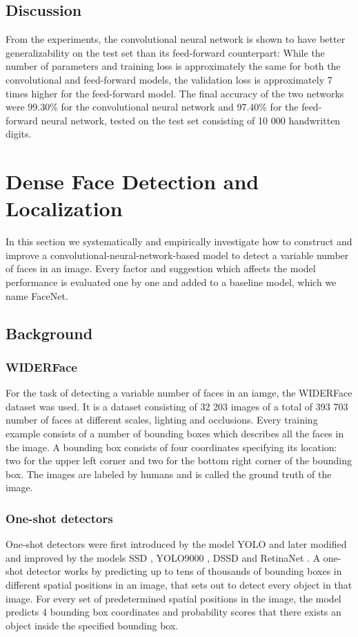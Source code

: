 \documentclass[a4paper, twoside]{article}
\begin{document}
\subsection{Discussion}
From the experiments, the convolutional neural network is shown to have better generalizability on the test set than its feed-forward counterpart: While the number of parameters and training loss is approximately the same for both the convolutional and feed-forward models, the validation loss is approximately 7 times higher for the feed-forward model. The final accuracy of the two networks were 99.30\% for the convolutional neural network and 97.40\% for the feed-forward neural network, tested on the test set consisting of 10 000 handwritten digits. 

\section{Dense Face Detection and Localization}
In this section we systematically and empirically investigate how to construct and improve a convolutional-neural-network-based model to detect a variable number of faces in an image. Every factor and suggestion which affects the model performance is evaluated one by one and added to a baseline model, which we name FaceNet.

\subsection{Background}
\subsubsection{WIDERFace}
For the task of detecting a variable number of faces in an iamge, the WIDERFace dataset \cite{WIDERFace} was used. It is a dataset consisting of 32 203 images of a total of 393 703 number of faces at different scales, lighting and occlusions. Every training example consists of a number of bounding boxes which describes all the faces in the image. A bounding box consists of four coordinates specifying its location: two for the upper left corner and two for the bottom right corner of the bounding box. The images are labeled by humans and is called the ground truth of the image.

\subsubsection{One-shot detectors}
One-shot detectors were first introduced by the model YOLO \cite{yolo} and later modified and improved by the models SSD \cite{ssd}, YOLO9000 \cite{yolo9000}, DSSD \cite{dssd} and RetinaNet \cite{retinanet}. A one-shot detector works by predicting up to tens of thousands of bounding boxes in different spatial positions in an image, that sets out to detect every object in that image. For every set of predetermined spatial positions in the image, the model predicts 4 bounding box coordinates and probability scores that there exists an object inside the specified bounding box.
\end{document}
